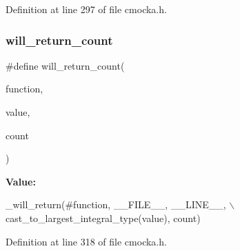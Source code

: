 Definition at line 297 of file cmocka.\+h.

\mbox{\label{group__cmocka__mock_gaab1cabbc12a25d322f75b77aa67eaf2c}} 
\subsubsection{\texorpdfstring{will\+\_\+return\+\_\+count}{will\_return\_count}}
{\footnotesize\ttfamily \#define will\+\_\+return\+\_\+count(\begin{DoxyParamCaption}\item[{}]{function,  }\item[{}]{value,  }\item[{}]{count }\end{DoxyParamCaption})}

{\bfseries Value\+:}
\begin{DoxyCode}
\_will\_return(#\textcolor{keyword}{function}, \_\_FILE\_\_, \_\_LINE\_\_, \(\backslash\)
                 cast\_to\_largest\_integral\_type(value), count)
\end{DoxyCode}


Definition at line 318 of file cmocka.\+h.

